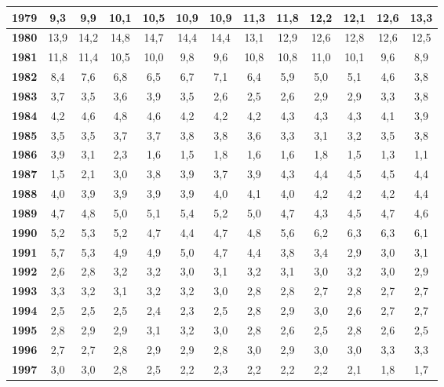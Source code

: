 \begin{center}
\begin{footnotesize}
\begin{longtable}{|c|c|c|c|c|c|c|c|c|c|c|c|c|}
\hline 
\textbf{1979} & 9,3 & 9,9 & 10,1 & 10,5 & 10,9 & 10,9 & 11,3 & 11,8 & 12,2 & 12,1 & 12,6 & 13,3  \\ 
\hline 
\textbf{1980} & 13,9 & 14,2 & 14,8 & 14,7 & 14,4 & 14,4 & 13,1 & 12,9 & 12,6 & 12,8 & 12,6 & 12,5  \\ 
\hline 
\textbf{1981} & 11,8 & 11,4 & 10,5 & 10,0 & 9,8 & 9,6 & 10,8 & 10,8 & 11,0 & 10,1 & 9,6 & 8,9  \\ 
\hline 
\textbf{1982} & 8,4 & 7,6 & 6,8 & 6,5 & 6,7 & 7,1 & 6,4 & 5,9 & 5,0 & 5,1 & 4,6 & 3,8  \\ 
\hline 
\textbf{1983} & 3,7 & 3,5 & 3,6 & 3,9 & 3,5 & 2,6 & 2,5 & 2,6 & 2,9 & 2,9 & 3,3 & 3,8  \\ 
\hline 
\textbf{1984} & 4,2 & 4,6 & 4,8 & 4,6 & 4,2 & 4,2 & 4,2 & 4,3 & 4,3 & 4,3 & 4,1 & 3,9  \\ 
\hline 
\textbf{1985} & 3,5 & 3,5 & 3,7 & 3,7 & 3,8 & 3,8 & 3,6 & 3,3 & 3,1 & 3,2 & 3,5 & 3,8  \\ 
\hline 
\textbf{1986} & 3,9 & 3,1 & 2,3 & 1,6 & 1,5 & 1,8 & 1,6 & 1,6 & 1,8 & 1,5 & 1,3 & 1,1  \\ 
\hline 
\textbf{1987} & 1,5 & 2,1 & 3,0 & 3,8 & 3,9 & 3,7 & 3,9 & 4,3 & 4,4 & 4,5 & 4,5 & 4,4  \\ 
\hline 
\textbf{1988} & 4,0 & 3,9 & 3,9 & 3,9 & 3,9 & 4,0 & 4,1 & 4,0 & 4,2 & 4,2 & 4,2 & 4,4  \\ 
\hline 
\textbf{1989} & 4,7 & 4,8 & 5,0 & 5,1 & 5,4 & 5,2 & 5,0 & 4,7 & 4,3 & 4,5 & 4,7 & 4,6  \\ 
\hline 
\textbf{1990} & 5,2 & 5,3 & 5,2 & 4,7 & 4,4 & 4,7 & 4,8 & 5,6 & 6,2 & 6,3 & 6,3 & 6,1  \\ 
\hline 
\textbf{1991} & 5,7 & 5,3 & 4,9 & 4,9 & 5,0 & 4,7 & 4,4 & 3,8 & 3,4 & 2,9 & 3,0 & 3,1  \\ 
\hline 
\textbf{1992} & 2,6 & 2,8 & 3,2 & 3,2 & 3,0 & 3,1 & 3,2 & 3,1 & 3,0 & 3,2 & 3,0 & 2,9  \\ 
\hline 
\textbf{1993} & 3,3 & 3,2 & 3,1 & 3,2 & 3,2 & 3,0 & 2,8 & 2,8 & 2,7 & 2,8 & 2,7 & 2,7  \\ 
\hline 
\textbf{1994} & 2,5 & 2,5 & 2,5 & 2,4 & 2,3 & 2,5 & 2,8 & 2,9 & 3,0 & 2,6 & 2,7 & 2,7  \\ 
\hline 
\textbf{1995} & 2,8 & 2,9 & 2,9 & 3,1 & 3,2 & 3,0 & 2,8 & 2,6 & 2,5 & 2,8 & 2,6 & 2,5  \\ 
\hline 
\textbf{1996} & 2,7 & 2,7 & 2,8 & 2,9 & 2,9 & 2,8 & 3,0 & 2,9 & 3,0 & 3,0 & 3,3 & 3,3  \\ 
\hline 
\textbf{1997} & 3,0 & 3,0 & 2,8 & 2,5 & 2,2 & 2,3 & 2,2 & 2,2 & 2,2 & 2,1 & 1,8 & 1,7  \\ 

\end{longtable}
\end{footnotesize}
\end{center}
